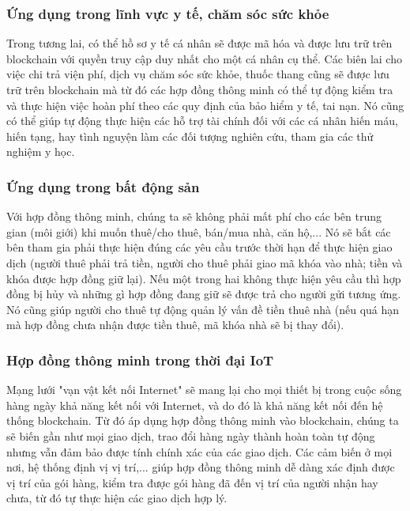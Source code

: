 \documentclass[a4paper]{article}
\begin{document}
\subsubsection{Ứng dụng trong lĩnh vực y tế, chăm sóc sức khỏe}
Trong tương lai, có thể hồ sơ y tế cá nhân sẽ được mã hóa và được lưu trữ trên blockchain với quyền truy cập duy nhất cho một cá nhân cụ thể. Các biên lai cho việc chi trả viện phí, dịch vụ chăm sóc sức khỏe, thuốc thang cũng sẽ được lưu trữ trên blockchain mà từ đó các hợp đồng thông minh có thể tự động kiểm tra và thực hiện việc hoàn phí theo các quy định của bảo hiểm y tế, tai nạn. Nó cũng có thể giúp tự động thực hiện các hỗ trợ tài chính đối với các cá nhân hiến máu, hiến tạng, hay tình nguyện làm các đối tượng nghiên cứu, tham gia các thử nghiệm y học.

\subsubsection{Ứng dụng trong bất động sản}
Với hợp đồng thông minh, chúng ta sẽ không phải mất phí cho các bên trung gian (môi giới) khi muốn thuê/cho thuê, bán/mua nhà, căn hộ,... Nó sẽ bắt các bên tham gia phải thực hiện đúng các yêu cầu trước thời hạn để thực hiện giao dịch (người thuê phải trả tiền, người cho thuê phải giao mã khóa vào nhà; tiền và khóa được hợp đồng giữ lại). Nếu một trong hai không thực hiện yêu cầu thì hợp đồng bị hủy và những gì hợp đồng đang giữ sẽ được trả cho người gửi tương ứng. Nó cũng giúp người cho thuê tự động quản lý vấn đề tiền thuê nhà (nếu quá hạn mà hợp đồng chưa nhận được tiền thuê, mã khóa nhà sẽ bị thay đổi).


\subsubsection{Hợp đồng thông minh trong thời đại IoT}
Mạng lưới "vạn vật kết nối Internet" sẽ mang lại cho mọi thiết bị trong cuộc sống hàng ngày khả năng kết nối với Internet, và do đó là khả năng kết nối đến hệ thống blockchain. Từ đó áp dụng hợp đồng thông minh vào blockchain, chúng ta sẽ biến gần như mọi giao dịch, trao đổi hàng ngày thành hoàn toàn tự động nhưng vẫn đảm bảo được tính chính xác của các giao dịch. Các cảm biến ở mọi nơi, hệ thống định vị vị trí,... giúp hợp đồng thông minh dễ dàng xác định được vị trí của gói hàng, kiểm tra được gói hàng đã đến vị trí của người nhận hay chưa, từ đó tự thực hiện các giao dịch hợp lý.
\end{document}
